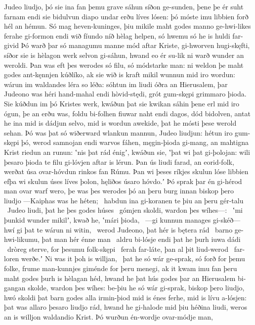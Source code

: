 Judeo liudjo, þó sie ina fan þemu grave sáhun
síðon ge-sunden, þene þe ér suht farnam
endi sie bidulvun diapo undar erðu
líves lósen: þó móste imu libbien forð
hél an hémun. Só mag heven-kuninges,
þiu mikile maht godes manno ge-hwi-likes
ferahe gi-formon endi wið fíundo níð
hèlag helpen, só hwemu só he is huldi far-givid
Þó warð þar só managumu manne mód aftar Kriste,
gi-hworven hugi-skęfti, síðor sie is hèlagon werk
selvon gi-sáhun, hwand eo ér su-lik ni warð
wunder an weroldi. Þan was eft þes werodes só filu,
só módstarke man: ni weldon þe maht godes
ant-kęnnjen kúðlíko, ak sie wið is kraft mikil
wunnun mid iro wordun: wárun im waldandes
léra so léða: sóhtun im liudi óðra
an Hierusalem, þar Judeono was
héri hand-mahal endi hòvid-stędi,
grót gum-skępi grimmaro þioda.
Sie kúðdun im þó Kristes werk, kwáðun þat sie kwikan sáhin
þene erl mid iro ógun, þe an erðu was,
foldu bi-folhen fiuwar naht endi dagos,
dód bidolven, antat he ina mid is dádjun selvo,
mid is wordun awekide, þat he mósti þese werold sehan.
Þó was þat só wiðerward wlankun mannun,
Judeo liudjun: hétun iro gum-skępi þó,
werod samnojan endi warvos fáhen,
męgin-þioda gi-mang, an mahtigna Krist
riedun an runun: ʽnis þat rád énigʼ, kwáðun sie,
ʽþat wi þat gi-þolojan: wili þesaro þioda te filu
gi-lóvjen aftar is lérun. Þan ús liudi farad,
an eorid-folk, werðat úsa ovar-hóvdun
rinkos fan Rúmu. Þan wi þeses ríkjes skulun
lóse libbien efþa wi skulun úses líves þolon,
hęliðos úsaro hóvdo.ʼ Þó sprak þar én gi-hérod man
ovar warf wero, þe was þes werodes þó
an þeru burg innan biskop þero liudjo
—Kaiphas was he héten; \hld\ habdun ina gi-koranen te þiu
an þeru gér-talu \hld\ Judeo liudi,
þat he þes godes húses \hld\ gómjen skoldi,
wardon þes wíhes—: \hld\ ʽmi þunkid wunder mikilʼ, kwað he,
ʽmári þioda, \hld\ —gi kunnun manages gi-skéð—
hwí gi þat te wárun ni witin, \hld\ werod Judeono,
þat hér is bętera rád \hld\ barno ge-hwi-likumu,
þat man hér énne man \hld\ aldru bi-lósje
endi þat he þurh iuwa dádi \hld\ dròreg sterve,
for þesumu folk-skępi \hld\ ferah far-láte,
þan al þit liud-werod \hld\ far-loren werðe.ʼ
Ni was it þoh is willjan, \hld\ þat he só wár ge-sprak,
só forð for þemu folke, frume man-kunnjes
giménde for þeru menegi, ak it kwam imu fan þeru maht godes
þurh is hèlagan héd, hwand he þat hús godes
þar an Hierusalem bi-gangan skolde,
wardon þes wíhes: be-þiu he só wár gi-sprak,
biskop þero liudjo, hwó skoldi þat barn godes
alla irmin-þiod mid is énes ferhe,
mid is lívu a-lósjen: þat was allaro þesaro liudjo rád,
hwand he gi-halode mid þiu héðina liudi,
weros an is willjon waldandio Krist.
Þó wurðun én-wordje ovar-módje man,
